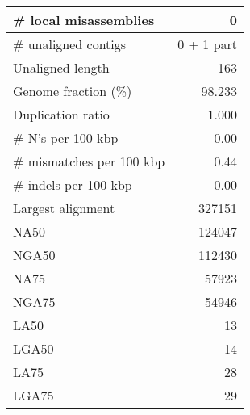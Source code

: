 \documentclass[12pt,a4paper]{article}
\begin{document}
\begin{table}[ht]
\begin{center}
\begin{tabular}{|l*{1}{|r}|}
\# local misassemblies & 0 \\ \hline
\# unaligned contigs & 0 + 1 part \\ \hline
Unaligned length & 163 \\ \hline
Genome fraction (\%) & 98.233 \\ \hline
Duplication ratio & 1.000 \\ \hline
\# N's per 100 kbp & 0.00 \\ \hline
\# mismatches per 100 kbp & 0.44 \\ \hline
\# indels per 100 kbp & 0.00 \\ \hline
Largest alignment & 327151 \\ \hline
NA50 & 124047 \\ \hline
NGA50 & 112430 \\ \hline
NA75 & 57923 \\ \hline
NGA75 & 54946 \\ \hline
LA50 & 13 \\ \hline
LGA50 & 14 \\ \hline
LA75 & 28 \\ \hline
LGA75 & 29 \\ \hline
\end{tabular}
\end{center}
\end{table}
\end{document}
